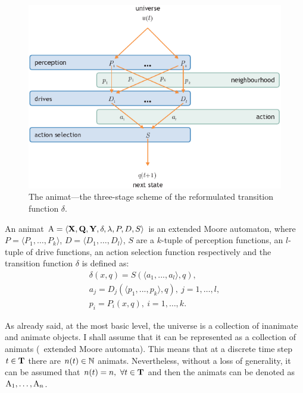 \begin{figure}%
\includegraphics{fig[animat]}
\caption{The animat---the three-stage scheme of the reformulated transition function $\delta$.}
\label{fig:animat}
\end{figure}

\begin{defn}
\label{def:animat}
An animat ${\mathrm{A}}=\langle{\ensuremath{\mathbf{X}}},{\mathbf{Q}},{\mathbf{Y}},\delta,\lambda,P,D,S\rangle$ is an extended Moore automaton, where $P=\langle P_1,\ldots,P_k\rangle$, $D=\langle D_1,\ldots,D_l\rangle$, $S$ are a $k$-tuple of perception functions, an $l$-tuple of drive functions, an action selection function respectively and the transition function $\delta$ is defined as:
\begin{eqnarray}
  & \delta(x,q) = S(\langle a_1,...,a_l\rangle,q), & \label{eq:animat:delta}\\
  & a_j = D_j(\langle p_1,...,p_k\rangle,q),\ j=1,\ldots,l, & \\
  & p_i = P_i(x,q),\ i=1,\ldots,k. & \label{eq:animat:Pi}
\end{eqnarray}
\end{defn}

As already said, at the most basic level, the universe is a collection of inanimate and animate objects. I shall assume that it can be represented as a collection of animats (\ie\ extended Moore automata). This means that at a discrete time step $t \in {\ensuremath{\mathbf{T}}}$ there are $n(t) \in \mathbb{N}$ animats. Nevertheless, without a loss of generality, it can be assumed that $n(t)=n,\ \forall t \in {\ensuremath{\mathbf{T}}}$ and then the animats can be denoted as ${\mathrm{A}}_1,\ldots,{\mathrm{A}}_n$. 

